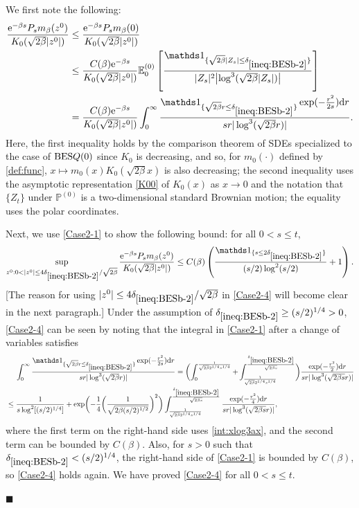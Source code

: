 \documentclass[12pt, twoside]{article}
\numberwithin{figure}{section}
\newcommand{\BES}{{\rm BES}}
\newcommand{\e}{{\mathrm e}}
\newcommand{\1}{\mathds 1}
\renewcommand{\P}{{\mathbb P}}
\newcommand{\E}{{\mathbb E}}
\renewcommand{\d}{{\mathrm d}}
\newcommand{\2}{{\mathbf 1}}
\renewenvironment{proof}[1][\proofname]{\noindent {\bfseries #1.}\;}{\hfill\ensuremath{\blacksquare}\\}
\newcommand{\cc}{{^\circ}}
\newcommand{\deltaz}{\delta_{\ref{ineq:BESb-2}}}
\begin{document}
\begin{proof}[Proof of Proposition~\ref{prop:BESmom} (1$\cc$)]
 We first note the following:
\begin{align}
\frac{\e^{-\beta s}P_{s} m_{\beta}(z^0)}{K_0(\sqrt{2\beta}|z^0|)}&\leq \frac{\e^{-\beta s}P_{s} m_{\beta}(0)}{K_0(\sqrt{2\beta}|z^0|)}\notag\\
&\leq \frac{C(\beta)\e^{-\beta s}}{K_0(\sqrt{2\beta}|z^0|)}
\E^{(0)}_0\left[\frac{\1_{\{\sqrt{2\beta}|Z_s|\leq \deltaz\}}}{|Z_s|^2\bigl|\log^3( \sqrt{2\beta}|Z_s|)\bigr|}\right]\notag\\
&= \frac{C(\beta)\e^{-\beta s}}{K_0(\sqrt{2\beta}|z^0|)}\int_0^\infty\frac{\1_{\{\sqrt{2\beta }r\leq \deltaz\}}\exp(-\frac{r^2}{2s})\d r}{sr |\log^3 (\sqrt{2\beta }r)|} .
\label{Case2-1}
\end{align}
Here, the first inequality holds by the comparison theorem of SDEs specialized to the case of $\BES Q(0)$ \cite[2.18 Proposition, p.293]{KS:BM} since
$K_0$ is decreasing, and so,
 for $m_0(\cdot)$ defined by \eqref{def:func}, $x\mapsto m_0(x) K_0(\sqrt{2\beta }x)$ is also decreasing; the second inequality uses the asymptotic representation \eqref{K00} of $K_0(x)$ as $x\to 0$ and the notation that $\{Z_t\}$ under $\P^{(0)}$ is a two-dimensional standard Brownian motion; the equality uses the polar coordinates. 

Next, we use \eqref{Case2-1} to show the following bound: for all $0<s\leq t$,
 \begin{align}\label{Case2-4}
\sup_{z^0:0<|z^0|\leq 4\deltaz/\sqrt{2\beta}}\frac{\e^{-\beta s}P_{s} m_{\beta}(z^0)}{K_0(\sqrt{2\beta}|z^0|)}\leq C(\beta) \left( \frac{\1_{\{s\leq 2\deltaz \}}}{(s/2)\log^2(s/2)}+1\right).
\end{align}
 [The reason for using $|z^0|\leq 4\deltaz/\sqrt{2\beta}$ in \eqref{Case2-4} will become clear in the next paragraph.] Under the assumption of $\deltaz\geq (s/2)^{1/4}>0$, \eqref{Case2-4} can be seen by noting that the integral in \eqref{Case2-1} after a change of variables satisfies 
\begin{align}
&\quad\;\int_0^\infty \frac{\1_{\{\sqrt{2\beta }r\leq \deltaz\}}\exp(-\frac{r^2}{2s})\d r}{sr |\log^3 (\sqrt{2\beta }r)|} 
=\biggl(\int_0^{\frac{1}{\sqrt{2\beta}2^{1/4}s^{1/4}}} +\int^{\frac{\deltaz}{\sqrt{2\beta s}}}_{\frac{1}{\sqrt{2\beta}2^{1/4}s^{1/4}}} \biggr)\frac{\exp(-\frac{r^2}{2})\d r}{sr |\log^3 (\sqrt{2\beta s}r)|}\notag\\
&\leq \frac{1}{s\log^2[(s/2)^{1/4}]}+\exp\biggl(-\frac{1}{4}\biggl(\frac{1}{\sqrt{2\beta (s/2)^{1/2}}}\biggr)^2\biggr)
\int^{\frac{\deltaz}{\sqrt{2\beta s}}}_{\frac{1}{\sqrt{2\beta}2^{1/4}s^{1/4}}} \frac{\exp(-\frac{r^2}{4})\d r}{sr |\log^3 (\sqrt{2\beta s}r)|},\notag
\end{align}
where the first term on the right-hand side uses \eqref{int:xlog3ax}, and
the second term can be bounded by $C(\beta)$. Also, for $s>0$ such that $\deltaz< (s/2)^{1/4}$, the right-hand side of \eqref{Case2-1} is bounded by $C(\beta)$, so \eqref{Case2-4}  holds again. We have proved \eqref{Case2-4} for all $0<s\leq t$. 


\end{proof}
\end{document}
